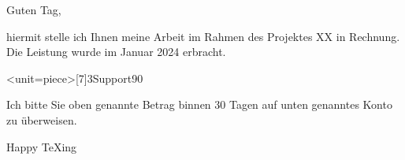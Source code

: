 \documentclass[parskip=half-,german]{scrartcl}
\begin{document}
\begin{letter}{}%

\opening{Guten Tag,}

hiermit stelle ich Ihnen meine Arbeit im Rahmen des Projektes XX in Rechnung. Die Leistung wurde im Januar 2024 erbracht. 

\AddInvoiceItem<unit=piece>[7]{3}{Support}{90}


\PrintInvoiceTabular

Ich bitte Sie oben genannte Betrag binnen 30 Tagen auf unten genanntes Konto zu überweisen.

\closing{Happy \TeX{}ing}

\end{letter}
\end{document}
